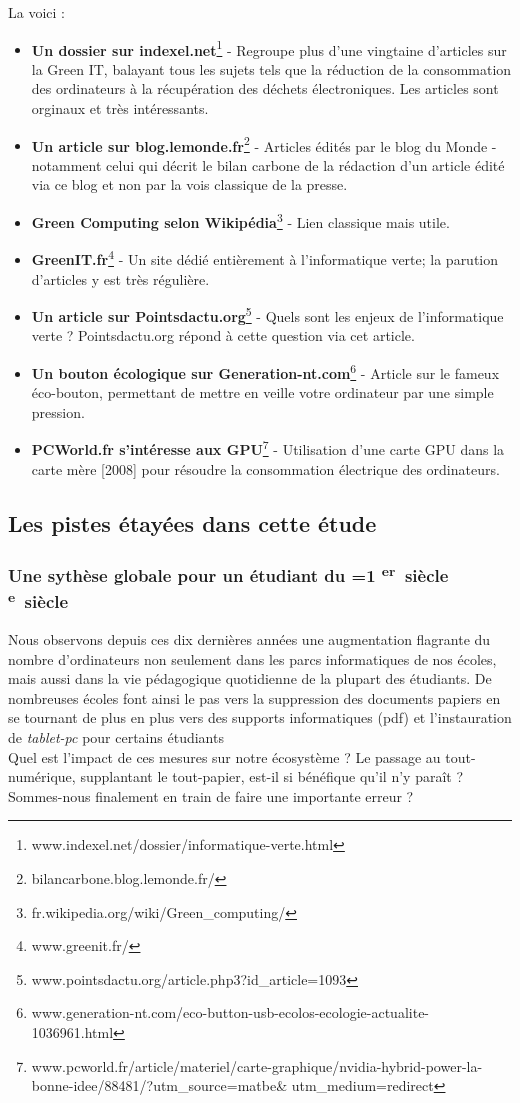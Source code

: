 \documentclass[a4paper,11pt,french]{article}
\newcommand*{\siecle}[1]{%
\ifnum#1=1%
\bsc{\romannumeral #1}\textsuperscript{er}~siècle%
\else%
\bsc{\romannumeral #1}\textsuperscript{e}~siècle%
\fi}
\begin{document}
La voici :
\begin{itemize}
\item \textbf{Un dossier sur indexel.net}\footnote{\textsf{www.indexel.net/dossier/informatique-verte.html}} - Regroupe plus d'une vingtaine d'articles sur la Green IT, balayant tous les sujets tels que la réduction de la consommation des ordinateurs à la récupération des déchets électroniques. Les articles sont orginaux et très intéressants.
\item \textbf{Un article sur blog.lemonde.fr}\footnote{\textsf{bilancarbone.blog.lemonde.fr/}} - Articles édités par le blog du Monde - notamment celui qui décrit le bilan carbone de la rédaction d'un article édité via ce blog et non par la vois classique de la presse.
\item \textbf{Green Computing selon Wikipédia}\footnote{\textsf{fr.wikipedia.org/wiki/Green\_{}computing/}} - Lien classique mais utile.
\item \textbf{GreenIT.fr}\footnote{\textsf{www.greenit.fr/}} - Un site dédié entièrement à l'informatique verte; la parution d'articles y est très régulière.
\item \textbf{Un article sur Pointsdactu.org}\footnote{\textsf{www.pointsdactu.org/article.php3?id\_{}article=1093}} - Quels sont les enjeux de l'informatique verte ? Pointsdactu.org répond à cette question via cet article.
\item \textbf{Un bouton écologique sur Generation-nt.com}\footnote{\textsf{www.generation-nt.com/eco-button-usb-ecolos-ecologie-actualite-1036961.html}} - Article sur le fameux éco-bouton, permettant de mettre en veille votre ordinateur par une simple pression.
\item \textbf{PCWorld.fr s'intéresse aux GPU}\footnote{\textsf{www.pcworld.fr/article/materiel/carte-graphique/nvidia-hybrid-power-la-bonne-idee/88481/?utm\_{}source=matbe\& utm\_{}medium=redirect}} - Utilisation d'une carte GPU dans la carte mère [2008] pour résoudre la consommation électrique des ordinateurs.
\end{itemize}


\subsection{Les pistes étayées dans cette étude}
\subsubsection{Une sythèse globale pour un étudiant du \siecle{21}}
Nous observons depuis ces dix dernières années une augmentation flagrante du nombre d'ordinateurs non seulement dans les parcs informatiques de nos écoles, mais aussi dans la vie pédagogique quotidienne de la plupart des étudiants. De nombreuses écoles font ainsi le pas vers la suppression des documents papiers en se tournant de plus en plus vers des supports informatiques (\textsf{pdf}) et l'instauration de \textit{tablet-pc} pour certains étudiants\\
Quel est l'impact de ces mesures sur notre écosystème ? Le passage au tout-numérique, supplantant le tout-papier, est-il si bénéfique qu'il n'y paraît ? Sommes-nous finalement en train de faire une importante erreur ?
\end{document}
